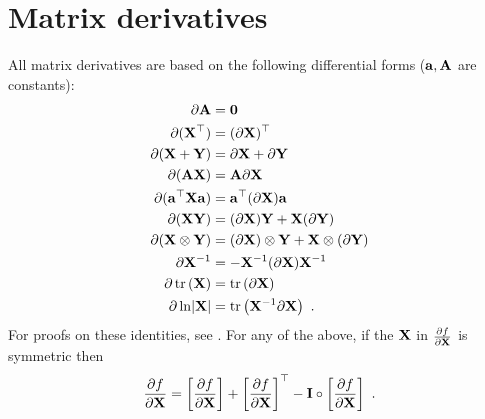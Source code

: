 



  \section{Matrix derivatives} \label{sec:app1_matrix_derivarives}


    All matrix derivatives are based on the following differential forms ($\mathbf{a}, \mathbf{A}$ are constants):
    \begin{align}
      \partial \mathbf{A} &= \mathbf{0} \\
      \partial (\mathbf{X}^\top) &= (\partial \mathbf{X})^\top \\
      \partial (\mathbf{X} + \mathbf{Y}) &= \partial \mathbf{X} + \partial\mathbf{Y} \\
      \label{equ:app1_deriv_constfactor} \partial (\mathbf{A}\mathbf{X}) &= \mathbf{A} \partial \mathbf{X} \\
      \partial (\mathbf{a}^\top\mathbf{X}\mathbf{a}) &= \mathbf{a}^\top (\partial \mathbf{X}) \mathbf{a}\\
      \partial (\mathbf{X}\mathbf{Y}) &= (\partial\mathbf{X})\mathbf{Y} + \mathbf{X}(\partial\mathbf{Y}) \\
      \label{equ:app1_deriv_kron} \partial (\mathbf{X} \otimes \mathbf{Y}) &= (\partial\mathbf{X})\otimes\mathbf{Y} + \mathbf{X}\otimes(\partial\mathbf{Y}) \\
      \partial \mathbf{X}^{-1} &= -\mathbf{X}^{-1}(\partial\mathbf{X})\mathbf{X}^{-1} \\
      \label{equ:app1_deriv_trace} \partial \, \textrm{tr} \left( \mathbf{X} \right) &= \textrm{tr} \left( \partial \mathbf{X} \right) \\
      \label{equ:app1_deriv_logdet} \partial \ln \lvert \mathbf{X} \rvert &= \textrm{tr} \left(  \mathbf{X}^{-1} \partial \mathbf{X}  \right) ~.
    \end{align}
    For proofs on these identities, see \citep{Magnus:matrix88}. For any of the above, if the $\mathbf{X}$ in $\frac{\partial f}{\partial \mathbf{X}}$ is symmetric then
    \begin{equation} \label{equ:app1_deriv_symmetricX} 
      \frac{\partial f}{\partial \mathbf{X}} = \left[\frac{\partial f}{\partial \mathbf{X}}\right] + \left[\frac{\partial f}{\partial \mathbf{X}}\right]^\top - \mathbf{I} \circ \left[\frac{\partial f}{\partial \mathbf{X}}\right] ~.
    \end{equation}


